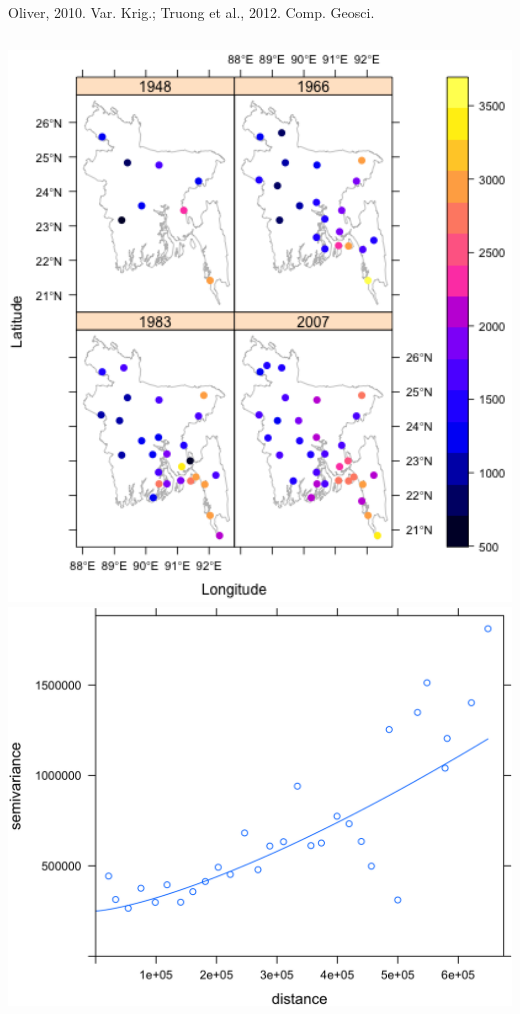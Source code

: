 \documentclass[10pt, compress]{beamer}
\begin{document}
\begin{frame}
{\begin{columns}
    \end{columns}\\
  \hspace{3cm} \footnotesize Oliver, 2010. Var. Krig.; Truong et al., 2012. Comp. Geosci.}
  {\begin{columns}
  \column{5cm}
    \centering
    \includegraphics[width=1.15\textwidth]{images/SSTP4.png}
    \column{5cm}
    \centering
    \includegraphics[width=1.15\textwidth]{images/SSTP7.png}

\end{columns}}
\end{frame}
\end{document}
